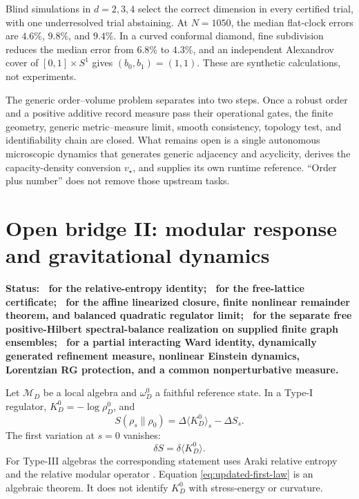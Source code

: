 Blind simulations in \(d=2,3,4\) select the correct dimension in every
certified trial, with one underresolved trial abstaining.  At \(N=1050\), the
median flat-clock errors are \(4.6\%\), \(9.8\%\), and \(9.4\%\).
In a curved conformal diamond, fine subdivision reduces the median error from
\(6.8\%\) to \(4.3\%\), and an independent Alexandrov cover of
\([0,1]\times S^1\) gives \((b_0,b_1)=(1,1)\).  These are synthetic
calculations, not experiments.

\begin{remark}
The generic order--volume problem separates into two steps.  Once a robust
order and a positive additive record measure pass their operational gates,
the finite geometry, generic metric--measure limit, smooth consistency,
topology test, and identifiability chain are closed.  What remains open is a
single autonomous microscopic dynamics that generates generic adjacency and
acyclicity, derives the capacity-density conversion \(v_\star\), and supplies
its own runtime reference.  ``Order plus number'' does not remove those
upstream tasks.
\end{remark}



\section{Open bridge II: modular response and gravitational dynamics}
\label{sec:updated-gravity-bridge}

\textbf{Status: \StatusAbstract\ for the relative-entropy identity;
\StatusNumerical\ for the free-lattice certificate;
\StatusModel\ for the affine linearized closure, finite nonlinear
remainder theorem, and balanced quadratic regulator limit;
\StatusModel\ for the separate free positive-Hilbert spectral-balance
realization on supplied finite graph ensembles; \StatusOpen\ for a partial
interacting Ward identity, dynamically generated refinement measure,
nonlinear Einstein dynamics, Lorentzian RG protection, and a common
nonperturbative measure.}

Let \(\mathcal M_D\) be a local algebra and
\(\omega_D^0\) a faithful reference state.  In a Type-I regulator,
\(K_D^0=-\log\rho_D^0\), and
\begin{equation}
 S(\rho_s\|\rho_0)
 =\Delta\langle K_D^0\rangle_s-\Delta S_s .
 \label{eq:updated-relative-entropy}
\end{equation}
The first variation at \(s=0\) vanishes:
\begin{equation}
 \delta S=\delta\langle K_D^0\rangle .
 \label{eq:updated-first-law}
\end{equation}
For Type-III algebras the corresponding statement uses Araki relative
entropy and the relative modular operator \cite{Araki}.  Equation
\eqref{eq:updated-first-law} is an algebraic theorem.  It does not identify
\(K_D^0\) with stress-energy or curvature.


